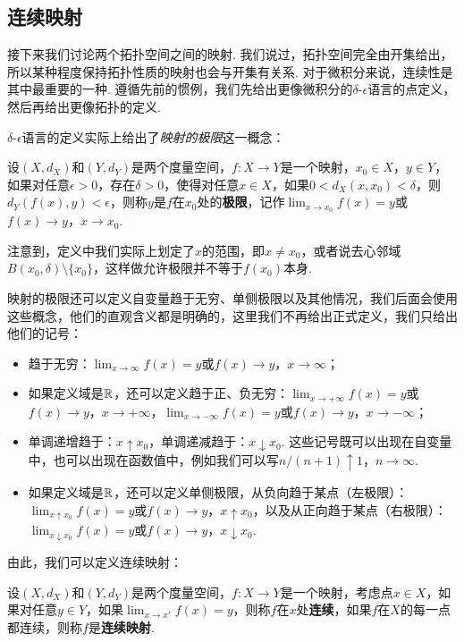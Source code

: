 \subsection{连续映射}
接下来我们讨论两个拓扑空间之间的映射. 我们说过，拓扑空间完全由开集给出，所以某种程度保持拓扑性质的映射也会与开集有关系. 对于微积分来说，连续性是其中最重要的一种. 遵循先前的惯例，我们先给出更像微积分的$\delta$-$\epsilon$语言的点定义，然后再给出更像拓扑的定义. 

$\delta$-$\epsilon$语言的定义实际上给出了\emph{映射的极限}这一概念：

\begin{definition}[映射的极限]
    设$(X,d_X)$和$(Y,d_Y)$是两个度量空间，$f:X\to Y$是一个映射，$x_0\in X$，$y\in Y$，如果对任意$\epsilon>0$，存在$\delta>0$，使得对任意$x\in X$，如果$0<d_X(x,x_0)<\delta$，则$d_Y(f(x),y)<\epsilon$，则称$y$是$f$在$x_0$处的\textbf{极限}，记作$\lim_{x\to x_0}f(x)=y$或$f(x)\to y$，$x\to x_0$.
\end{definition}
注意到，定义中我们实际上划定了$x$的范围，即$x\neq x_0$，或者说去心邻域$B(x_0,\delta)\setminus\{x_0\}$，这样做允许极限并不等于$f(x_0)$本身. 

\begin{remark}
映射的极限还可以定义自变量趋于无穷、单侧极限以及其他情况，我们后面会使用这些概念，他们的直观含义都是明确的，这里我们不再给出正式定义，我们只给出他们的记号：
\begin{itemize}
    \item 趋于无穷：$\lim_{x\to\infty}f(x)=y$或$f(x)\to y$，$x\to\infty$；
    \item 如果定义域是$\mathbb{R}$，还可以定义趋于正、负无穷：$\lim_{x\to+\infty}f(x)=y$或$f(x)\to y$，$x\to+\infty$，$\lim_{x\to-\infty}f(x)=y$或$f(x)\to y$，$x\to-\infty$；
    \item 单调递增趋于：$x\uparrow x_0$，单调递减趋于：$x\downarrow x_0$. 这些记号既可以出现在自变量中，也可以出现在函数值中，例如我们可以写$n/(n+1)\uparrow 1$，$n\to\infty$.
    \item 如果定义域是$\mathbb{R}$，还可以定义单侧极限，从负向趋于某点（左极限）：$\lim_{x\uparrow x_0}f(x)=y$或$f(x)\to y$，$x\uparrow x_0$，以及从正向趋于某点（右极限）：$\lim_{x\downarrow x_0}f(x)=y$或$f(x)\to y$，$x\downarrow x_0$.
\end{itemize}
\end{remark}

由此，我们可以定义连续映射：
\begin{definition}[连续映射]
    设$(X,d_X)$和$(Y,d_Y)$是两个度量空间，$f:X\to Y$是一个映射，考虑点$x\in X$，如果对任意$y\in Y$，如果$\lim_{x\to x'}f(x)=y$，则称$f$在$x$处\textbf{连续}，如果$f$在$X$的每一点都连续，则称$f$是\textbf{连续映射}.
\end{definition}

